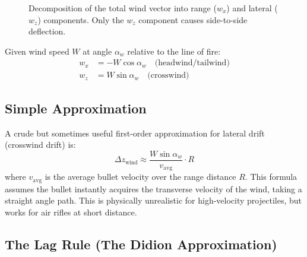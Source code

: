 \documentclass[11pt,twoside,openright]{report}
\begin{document}
\begin{figure}[H]
\centering
{}
\caption{Decomposition of the total wind vector into range ($w_x$) and lateral ($w_z$) components. Only the $w_z$ component causes side-to-side deflection.}
\label{fig:wind_vectors}
\end{figure}

Given wind speed $W$ at angle $\alpha_w$ relative to the line of fire:
\begin{align}
  w_x &= -W\cos\alpha_w \quad \text{(headwind/tailwind)} \label{eq:wind_x}\\
  w_z &= W\sin\alpha_w \quad \text{(crosswind)} \label{eq:wind_z}
\end{align}

\subsection{Simple Approximation}

A crude but sometimes useful first-order approximation for lateral drift (crosswind drift) is:
\begin{equation}
  \Delta z_{\mathrm{wind}} \approx \frac{W\sin\alpha_w}{v_{\mathrm{avg}}} \cdot R
  \label{eq:simple_wind}
\end{equation}
where $v_{\mathrm{avg}}$ is the average bullet velocity over the range distance $R$. This formula assumes the bullet instantly acquires the transverse velocity of the wind, taking a straight angle path. This is physically unrealistic for high-velocity projectiles, but works for air rifles at short distance.

\subsection{The Lag Rule (The Didion Approximation)}
\end{document}
